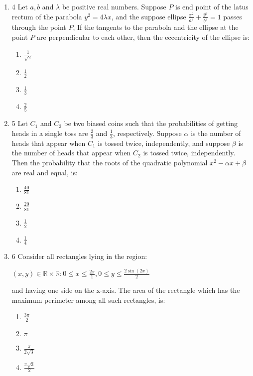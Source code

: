 \documentclass{article}
\begin{document}
\begin{enumerate}
\item 4  Let $a, b$ and $\lambda$ be positive real numbers. Suppose $P$ is end point of the latus rectum of the parabola $y^2 = 4\lambda x$, and the suppose ellipse $\frac{x^2}{a^2} + \frac{y^2}{b^2} = 1$ passes through the point $P$, If the tangents to the parabola and the ellipse at the point $P$ are perpendicular to each other, then the eccentricity of the ellipse is:

    \begin{enumerate}
        \item  $\frac{1}{\sqrt{2}}$
        \item  $\frac{1}{2}$
        \item  $\frac{1}{3}$
        \item  $\frac{2}{5}$
    \end{enumerate}

\item 5   Let $C_1$ and $C_2$ be two biased coins such that the probabilities of getting heads in a single toss are $\frac{2}{3}$ and $\frac{1}{3}$, respectively. Suppose $\alpha$ is the number of heads that appear when $C_1$ is tossed twice, independently, and suppose $\beta$ is the number of heads that appear when $C_2$ is tossed twice, independently. Then the probability that the roots of the quadratic polynomial $x^2 - \alpha x +\beta$ are real and equal, is:

    \begin{enumerate}
        \item  $\frac{40}{81}$
        \item  $\frac{20}{81}$
        \item  $\frac{1}{2}$
        \item  $\frac{1}{4}$
    \end{enumerate}

\item 6  Consider all rectangles lying in the region:

\begin{center}
	$ {(x,y) \in \mathbb{R} \times \mathbb{R} : 0 \leq x \leq \frac{2\pi} 1, 0 \leq y \leq \frac{2\sin(2x)}{2}}$
\end{center}

    and having one side on the x-axis. The area of the rectangle which has the maximum perimeter among all such rectangles, is:

    \begin{enumerate}
        \item  $\frac{3\pi}{2}$
        \item  $\pi$
        \item  $\frac{\pi}{2\sqrt{3}}$
        \item  $\frac{\pi\sqrt{3}}{2}$
    \end{enumerate}


\end{enumerate}
\end{document}
